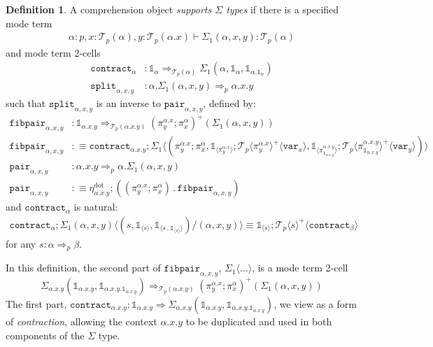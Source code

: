 \documentclass[10pt]{article}
\theoremstyle{definition}
\newtheorem{definition}{Definition}
\newcommand{\tcell}{\Rightarrow}
\newcommand\TrPlus[2]{\ensuremath{{#1}^+(#2)}}
\newcommand\El[2]{\mathcal{T}_{#1}(#2)}
\newcommand\ApEl[2]{\mathcal{T}_{#1}\langle#2\rangle}
\newcommand\bdot[0]{\mathbin{.}}
\newcommand\ap[2]{\ensuremath{#1 \langle #2 \rangle }}
\newcommand\ApPlus[2]{\ensuremath{{#1}^+ \langle #2 \rangle }}
\newcommand{\sdot}{\ensuremath{\mathrm{dot}}}
\newcommand\One{\ensuremath{\mathds{1}}}
\newcommand\var[1]{\ensuremath{\mathtt{var}_{#1}}}
\newcommand\ApOne[1]{\ensuremath{\One_{\langle {#1} \rangle }}}
\newcommand\contract[1]{\ensuremath{\mathtt{contract}_{#1}}}
\newcommand\fibpair[1]{\ensuremath{\mathtt{fibpair}_{#1}}}
\newcommand\pair[1]{\ensuremath{\mathtt{pair}_{#1}}}
\newcommand\tsplit[1]{\ensuremath{\mathtt{split}_{#1}}}
\begin{document}
\begin{definition}\label{def:supports-sigmas}
A comprehension object \emph{supports $\Sigma$ types} if there is a specified mode term
\begin{align*}
\alpha : p, x : \El{p}{\alpha}, y : \El{p}{\alpha.x} \vdash \Sigma_1(\alpha,x,y) : \El{p}{\alpha}
\end{align*}
and mode term 2-cells
\begin{align*}
\contract{\alpha} &: \One_\alpha \tcell_{\El{p}{\alpha}} \Sigma_1(\alpha,\One_\alpha,\One_{\alpha.{\One_\alpha}}) \\
\tsplit{\alpha,x,y} &: \alpha.\Sigma_1(\alpha,x,y) \tcell_{p} \alpha.x.y
\end{align*}
such that $\tsplit{\alpha,x,y}$ is an inverse to $\pair{\alpha,x,y}$, defined by:
\begin{align*}
\fibpair{\alpha,x,y} &: \One_{\alpha.x.y} \tcell_{\El{p}{\alpha.x.y}} \TrPlus{(\pi^{\alpha.x}_y;\pi^\alpha_x)}{\Sigma_1(\alpha,x,y)} \\
\fibpair{\alpha,x,y} &:\equiv \contract{\alpha.x.y};\ap{\Sigma_1}{(\pi^{\alpha.x}_y;\pi^{\alpha}_x,\ApOne{\pi^{\alpha.x}_y};\ApPlus{\ApEl{p}{\pi^{\alpha.x}_y}}{\var{x}}, \ApOne{\pi^{\alpha.x.y}_{\One_{\alpha.x.y}}};\ApPlus{\ApEl{p}{\pi^{\alpha.x.y}_{\One_{\alpha.x.y}}}}{\var{y}})} \\
\pair{\alpha,x,y} &: \alpha.x.y \tcell_{p} \alpha.\Sigma_1(\alpha,x,y) \\
\pair{\alpha, x, y} &:\equiv \eta^\sdot_{\alpha.x.y};((\pi^{\alpha.x}_y;\pi^\alpha_x) \bdot \fibpair{\alpha,x,y})
\end{align*}
and $\contract{\alpha}$ is natural:
\begin{align}
\contract{\alpha};\ap{\Sigma_1(\alpha,x,y)}{(s, \ApOne{s}, \ApOne{s \bdot \ApOne{s}})/(\alpha,x,y)} \equiv \ApOne{s};\ApPlus{\ApEl{p}{s}}{\contract{\beta}}
\end{align}
for any $s : \alpha \tcell_p \beta$.
\end{definition}

In this definition, the second part of $\fibpair{\alpha,x,y}$,
$\ap{\Sigma_1}{\ldots}$, is a mode term 2-cell
\[
\Sigma_{\alpha.x.y}(\One_{\alpha.x.y},\One_{\alpha.x.y.\One_{\alpha.x.y}}) \tcell_{\El p {\alpha.x.y}} \TrPlus{(\pi^{\alpha.x}_y;\pi^\alpha_x)}{\Sigma_1(\alpha,x,y)}
\]
The first part, $\contract{\alpha.x.y} : \One_{\alpha.x.y} \tcell
\Sigma_{\alpha.x.y}(\One_{\alpha.x.y},\One_{\alpha.x.y.\One_{\alpha.x.y}})$,
we view as a form of \emph{contraction}, allowing the context
$\alpha.x.y$ to be duplicated and used in both components of the
$\Sigma$ type.
\end{document}
